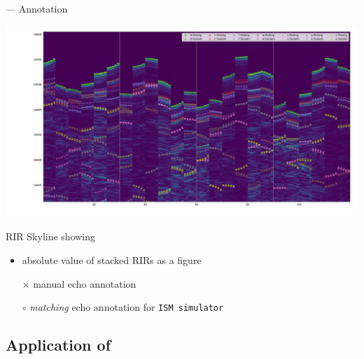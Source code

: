 \begin{frame}{\dechorate --- Annotation}
    \begin{center}
        \includegraphics[trim={10em 0 0 0},clip,width=\linewidth]{figures/dechorate/rir_skyline_final_mod4paper.pdf}
    \end{center}

    \vspace*{-2mm}
    RIR Skyline showing
    \begin{itemize}
        \item absolute value of stacked RIRs as a figure
        \item[$\times$] manual echo annotation
        \item[$\circ$] \textit{matching} echo annotation for \texttt{ISM simulator}
    \end{itemize}
\end{frame}

\subsection{Application of \dechorate}

